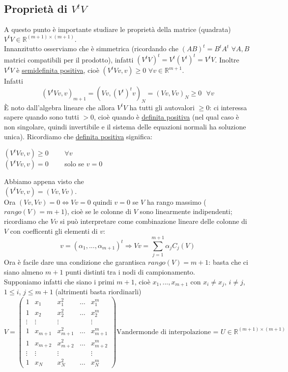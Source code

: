 \documentclass[12pt,a4paper]{article}
\begin{document}
\subsection{Proprietà di $V^tV$}
A questo punto è importante studiare le proprietà della matrice (quadrata) $V^tV\in\mathbb{R}^{(m+1)\times(m+1)}$.\\Innanzitutto osserviamo che è simmetrica (ricordando che $(AB)^t=B^tA^t$ $\forall A,B$ matrici compatibili per il prodotto), infatti $(V^t V)^t=V^t(V^t)^t=V^tV$. Inoltre $V^tV$ è \uline{semidefinita positiva}, cioè $(V^tVv,v)\geq0$ $\forall v\in\mathbb{R}^{m+1}$.\\ Infatti
\begin{equation*}
    (V^tVv,v)_{m+1}=(Vv,(V^t)^tv)_N=(Vv,Vv)_N\geq0\  \  \  \forall v
\end{equation*}
È noto dall'algebra lineare che allora $V^tV$ ha tutti gli autovalori $\geq0$: ci interessa sapere quando sono tutti $>0$, cioè quando è \uline{definita positiva} (nel qual caso è non singolare, quindi invertibile e il sistema delle equazioni normali ha soluzione unica). Ricordiamo che \uline{definita positiva} significa:
\begin{center}
     $(V^tVv,v)\geq0$ \  \  \   \   $\forall v$   \\
     $(V^tVv,v)=0$  \  \  \  \   solo se $v=0$
\end{center}
Abbiamo appena visto che\\
$(V^tVv,v)=(Vv,Vv)$.\\Ora $(Vv,Vv)=0 \iff Vv=0$ quindi $v=0$ se $V$ ha rango massimo ($rango(V)=m+1$), cioè se le colonne di $V$ sono linearmente indipendenti; ricordiamo che $Vv$ si può interpretare come combinazione lineare delle colonne di $V$ con coefficenti gli elementi di $v$:
\begin{equation*}
    v=(\alpha_1,...,\alpha_{m+1})^t\Rightarrow Vv=\sum_{j=1}^{m+1}\alpha_jC_j(V)
\end{equation*}
Ora è facile dare una condizione che garantisca $rango(V)=m+1$:
basta che ci siano almeno $m+1$ punti distinti tra i nodi di campionamento.\\Supponiamo infatti che siano i primi $m+1$, cioè $x_1,...,x_{m+1}$ con $x_i\neq x_j$, $i\neq j$, $1\leq i$, $j\leq m+1$ (altrimenti basta riordinarli)
\[
    V = 
\begin{pmatrix}
1 & x_1 & x_1^2 & \dotso & x_1^m \\
1 & x_2 & x_2^2 & \dotso & x_2^m \\
\vdots & \vdots & \vdots & & \vdots \\
1 & x_{m+1} & x_{m+1}^2 & \dotso & x_{m+1}^m \\
1 & x_{m+2} & x_{m+2}^2 & \dotso & x_{m+2}^m \\
\vdots & \vdots & \vdots & & \vdots \\
1 & x_N & x_N^2 & \dotso & x_N^m
\end{pmatrix}
\text{Vandermonde di interpolazione = } U \in \mathbb{R}^{(m+1) \times (m+1)}
\]
\end{document}
